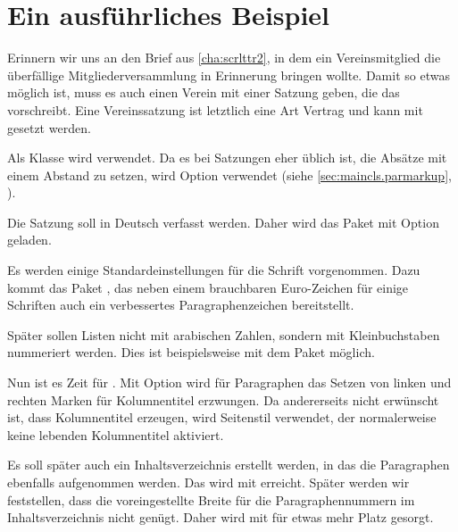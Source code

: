 \section{Ein ausführliches Beispiel}
\label{sec:scrjura.example}

Erinnern wir uns an den Brief aus \autoref{cha:scrlttr2}, in dem ein
Vereinsmitglied die überfällige Mitgliederversammlung in Erinnerung bringen
wollte. Damit so etwas möglich ist, muss es auch einen Verein mit einer
Satzung geben, die das vorschreibt. Eine Vereinssatzung ist letztlich eine Art
Vertrag und kann mit  gesetzt werden.

%
Als Klasse wird  verwendet. Da es bei Satzungen eher üblich
ist, die Absätze mit einem Abstand zu setzen, wird Option
 verwendet (siehe
\autoref{sec:maincls.parmarkup}, ).

%
Die Satzung soll in Deutsch verfasst werden. Daher wird das Paket
 mit Option  geladen.

%
Es werden einige Standardeinstellungen für die Schrift vorgenommen. Dazu kommt
das Paket , das neben einem brauchbaren Euro-Zeichen für
einige Schriften auch ein verbessertes Paragraphenzeichen bereitstellt.

%
Später sollen Listen nicht mit arabischen Zahlen, sondern mit Kleinbuchstaben
nummeriert werden. Dies ist beispielsweise mit dem Paket 
möglich.

%
Nun ist es Zeit für . Mit Option
 wird für Paragraphen das
Setzen von linken und rechten Marken für Kolumnentitel erzwungen. Da
andererseits nicht erwünscht ist, dass 
Kolumnentitel erzeugen, wird Seitenstil  verwendet, der
normalerweise keine lebenden Kolumnentitel aktiviert.

Es soll später auch ein Inhaltsverzeichnis erstellt werden, in das die
Paragraphen ebenfalls aufgenommen werden. Das wird mit
 erreicht. Später werden wir feststellen,
dass die voreingestellte Breite für die Paragraphennummern im
Inhaltsverzeichnis nicht genügt. Daher wird mit
 für etwas mehr Platz
gesorgt.

